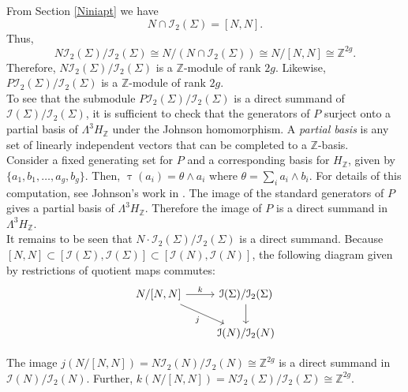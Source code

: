 \documentclass[a4paper]{amsproc}
\theoremstyle{TheoremNum}
\theoremstyle{Theorembold}
\theoremstyle{TheoremboldDef}
\theoremstyle{TheoremboldRem}
\theoremstyle{TheoremboldRem}
\begin{document}
From Section \ref{Niniapt} we have \[N\cap{{\mathcal{I}}_2(\Sigma)}=[N,N].\]
Thus, \[N{{\mathcal{I}}_2(\Sigma)}/{{\mathcal{I}}_2(\Sigma)}\cong N/(N\cap{{\mathcal{I}}_2(\Sigma)})\cong N/[N,N]\cong {\mathbb{Z}}^{2g}.\]
 Therefore, $N{{\mathcal{I}}_2(\Sigma)}/{{\mathcal{I}}_2(\Sigma)}$ is a ${\mathbb{Z}}$-module of rank $2g$. Likewise, $P{{\mathcal{I}}_2(\Sigma)}/{{\mathcal{I}}_2(\Sigma)}$ is a ${\mathbb{Z}}$-module of  rank $2g$.\\

To see that the submodule $P{{\mathcal{I}}_2(\Sigma)}/{{\mathcal{I}}_2(\Sigma)}$ is a direct summand of ${{\mathcal{I}}(\Sigma)}/{{\mathcal{I}}_2(\Sigma)}$, it is sufficient to check that the generators of $P$ surject onto a partial basis of $\Lambda^3H_{\mathbb{Z}}$ under the Johnson homomorphism. A \emph{partial basis} is any set of linearly independent vectors that can be completed to a ${\mathbb{Z}}$-basis. \\
Consider a fixed generating set for $P$ and a corresponding basis for $H_{\mathbb{Z}}$, given by $\{a_1,b_1,\dots, a_g,b_g\}$. Then, $\uptau(a_i)=\theta\wedge a_i$ where $\theta=\sum_i a_i\wedge b_i$. For details of this computation, see Johnson's work in \cite{abelianquotient}. The image of the standard generators of $P$ gives a partial basis of $\Lambda^3H_{\mathbb{Z}}$. Therefore the image of $P$ is a direct summand in $\Lambda^3H_{\mathbb{Z}}$. \\
 
 It remains to be seen that $N\cdot {{\mathcal{I}}_2(\Sigma)}/{{\mathcal{I}}_2(\Sigma)}$ is a direct summand. Because $[N,N]\subset[{{\mathcal{I}}(\Sigma)},{{\mathcal{I}}(\Sigma)}]\subset[{{\mathcal{I}}(N)},{{\mathcal{I}}(N)}]$, the following diagram given by restrictions of quotient maps commutes:
  \begin{equation}\label{abelianN}
  \begin{tikzcd}
 N/[N,N] \arrow{r}{k}\arrow{rd}[swap]{j}  & {{\mathcal{I}}(\Sigma)}/{{\mathcal{I}}_2(\Sigma)}\arrow{d}{}  \\
  &{{\mathcal{I}}(N)}/{{\mathcal{I}}_2(N)}
 \end{tikzcd}
 \end{equation}
 
 The image $j(N/[N,N])=N{{\mathcal{I}}_2(N)}/{{\mathcal{I}}_2(N)}\cong{\mathbb{Z}}^{2g}$ is a direct summand in ${{\mathcal{I}}(N)}/{{\mathcal{I}}_2(N)}$. Further, $k(N/[N,N])=N{{\mathcal{I}}_2(\Sigma)}/{{\mathcal{I}}_2(\Sigma)}\cong{\mathbb{Z}}^{2g}$.  
 
\end{document}
